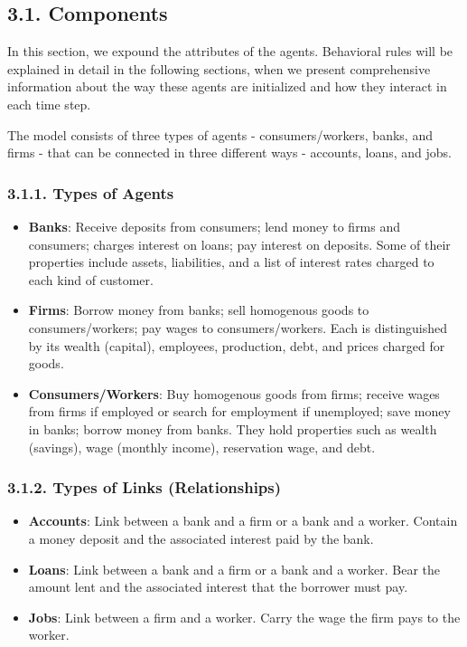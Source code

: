 \documentclass[11pt,]{article}
\begin{document}
\subsection{3.1. Components}\label{components}

In this section, we expound the attributes of the agents. Behavioral
rules will be explained in detail in the following sections, when we
present comprehensive information about the way these agents are
initialized and how they interact in each time step.

The model consists of three types of agents - consumers/workers, banks,
and firms - that can be connected in three different ways - accounts,
loans, and jobs.

\subsubsection{3.1.1. Types of Agents}\label{types-of-agents}

\begin{itemize}
\item
  \textbf{Banks}: Receive deposits from consumers; lend money to firms
  and consumers; charges interest on loans; pay interest on deposits.
  Some of their properties include assets, liabilities, and a list of
  interest rates charged to each kind of customer.
\item
  \textbf{Firms}: Borrow money from banks; sell homogenous goods to
  consumers/workers; pay wages to consumers/workers. Each is
  distinguished by its wealth (capital), employees, production, debt,
  and prices charged for goods.
\item
  \textbf{Consumers/Workers}: Buy homogenous goods from firms; receive
  wages from firms if employed or search for employment if unemployed;
  save money in banks; borrow money from banks. They hold properties
  such as wealth (savings), wage (monthly income), reservation wage, and
  debt.
\end{itemize}

\subsubsection{3.1.2. Types of Links
(Relationships)}\label{types-of-links-relationships}

\begin{itemize}
\item
  \textbf{Accounts}: Link between a bank and a firm or a bank and a
  worker. Contain a money deposit and the associated interest paid by
  the bank.
\item
  \textbf{Loans}: Link between a bank and a firm or a bank and a worker.
  Bear the amount lent and the associated interest that the borrower
  must pay.
\item
  \textbf{Jobs}: Link between a firm and a worker. Carry the wage the
  firm pays to the worker.
\end{itemize}
\end{document}

